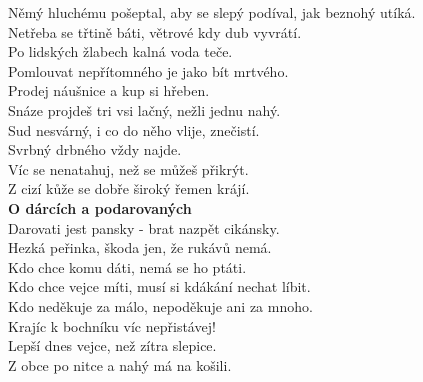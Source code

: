 \begin{multicols}{\value{columnsgames}}
Němý hluchému pošeptal, aby se slepý podíval, jak beznohý utíká.\\
Netřeba se třtině báti, větrové kdy dub vyvrátí.\\
Po lidských žlabech kalná voda teče.\\
Pomlouvat nepřítomného je jako bít mrtvého.\\
Prodej náušnice a kup si hřeben.\\
Snáze projdeš tri vsi lačný, nežli jednu nahý.\\
Sud nesvárný, i co do něho vlije, znečistí.\\
Svrbný drbného vždy najde.\\
Víc se nenatahuj, než se můžeš přikrýt.\\
Z cizí kůže se dobře široký řemen krájí.\\

\noindent
{\large\bf O dárcích a podarovaných}\\[1 mm]
Darovati jest pansky - brat nazpět cikánsky.\\
Hezká peřinka, škoda jen, že rukávů nemá.\\
Kdo chce komu dáti, nemá se ho ptáti.\\
Kdo chce vejce míti, musí si kdákání nechat líbit.\\
Kdo neděkuje za málo, nepoděkuje ani za mnoho.\\
Krajíc k bochníku víc nepřistávej!\\
Lepší dnes vejce, než zítra slepice.\\
Z obce po nitce a nahý má na košili.\\


\end{multicols}
